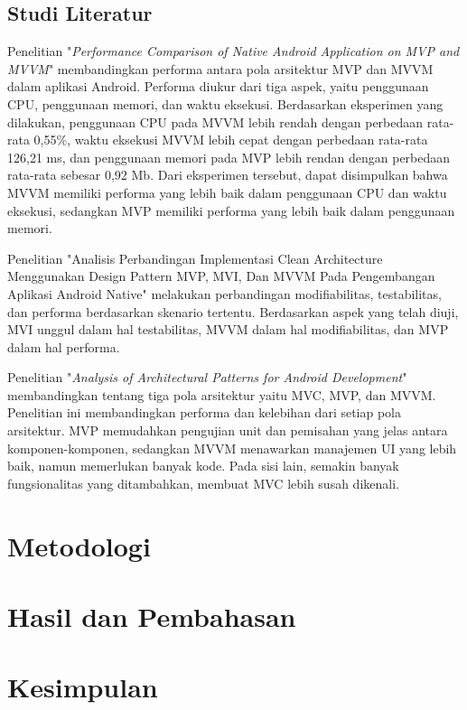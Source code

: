 \documentclass[conference]{IEEEtran}
\begin{document}
	\subsection{Studi Literatur}
	Penelitian "\textit{Performance Comparison of Native Android Application on MVP and MVVM}" \cite{Wis2020} membandingkan performa antara pola arsitektur MVP dan MVVM dalam aplikasi Android. Performa diukur dari tiga aspek, yaitu penggunaan CPU, penggunaan memori, dan waktu eksekusi. Berdasarkan eksperimen yang dilakukan, penggunaan CPU pada MVVM lebih rendah dengan perbedaan rata-rata 0,55\%, waktu eksekusi MVVM lebih cepat dengan perbedaan rata-rata 126,21 ms, dan penggunaan memori pada MVP lebih rendan dengan perbedaan rata-rata sebesar 0,92 Mb. Dari eksperimen tersebut, dapat disimpulkan bahwa MVVM memiliki performa yang lebih baik dalam penggunaan CPU dan waktu eksekusi, sedangkan MVP memiliki performa yang lebih baik dalam penggunaan memori. 
	
	Penelitian "Analisis Perbandingan Implementasi Clean Architecture Menggunakan Design Pattern MVP, MVI, Dan MVVM Pada Pengembangan Aplikasi Android Native" \cite{Fir2024} melakukan perbandingan modifiabilitas, testabilitas, dan performa berdasarkan skenario tertentu. Berdasarkan aspek yang telah diuji, MVI unggul dalam hal testabilitas, MVVM dalam hal modifiabilitas, dan MVP dalam hal performa. 
	
	Penelitian "\textit{Analysis of Architectural Patterns for Android Development}" \cite{Akh2021} membandingkan tentang tiga pola arsitektur yaitu MVC, MVP, dan MVVM. Penelitian ini membandingkan performa dan kelebihan dari setiap pola arsitektur. MVP memudahkan pengujian unit dan pemisahan yang jelas antara komponen-komponen, sedangkan MVVM menawarkan manajemen UI yang lebih baik, namun memerlukan banyak kode. Pada sisi lain, semakin banyak fungsionalitas yang ditambahkan, membuat MVC lebih susah dikenali. 
	
	\section{Metodologi}

	
	\section{Hasil dan Pembahasan}

	
	\section{Kesimpulan}
	



\end{document}
